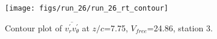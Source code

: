 \begin{figure}[H]
\centering
\texttt{[image: figs/run\_26/run\_26\_rt\_contour]}
\caption{Contour plot of $\overline{v_{r}^{\prime} v_{\theta}^{\prime}}$ at $z/c$=7.75, $V_{free}$=24.86, station 3.}
\label{fig:run_26_rt_contour}
\end{figure}


